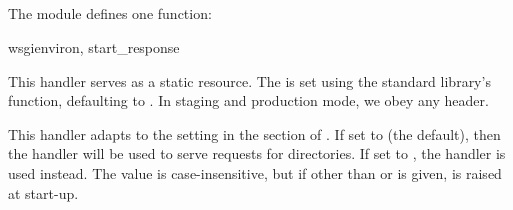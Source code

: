 \subsection{}
\label{api-handlers-static}

The  module defines one function:

\begin{funcdesc}{wsgi}{environ, start_response}

This handler serves  as a static resource. The
 is set using the standard library's
 function, defaulting to . In
staging and production mode, we obey any  header.

This handler adapts to the  setting in the \code{[static]}
section of . If set to  (the default), then the
 handler will be used to serve requests for
directories. If set to , the  handler
is used instead. The  value is case-insensitive, but if other
than  or  is given,  is raised at
start-up.

\end{funcdesc}
